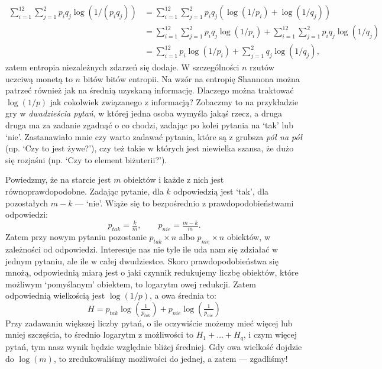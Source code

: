 \documentclass[10pt,a4paper]{article}
\begin{document}
\begin{align}
    \sum_{i=1}^{12} \sum_{j=1}^2 p_i q_j \log(1/(p_i q_j))
    &= \sum_{i=1}^{12} \sum_{j=1}^2 p_i q_j \left( \log(1/p_i) + \log(1/q_j) \right)\\
    &= \sum_{i=1}^{12} \sum_{j=1}^2 p_i q_j \log(1/p_i)
    +\sum_{i=1}^{12} \sum_{j=1}^2 p_i q_j \log(1/q_j)\\
    &= \sum_{i=1}^{12} p_i \log(1/p_i)
    + \sum_{j=1}^2 q_j \log(1/q_j),
\end{align}
%
zatem entropia niezależnych zdarzeń się dodaje.
W szczególności $n$ rzutów uczciwą monetą to $n$ bitów bitów entropii.
%
%
Na wzór na entropię Shannona można patrzeć również jak na średnią uzyskaną informację.
Dlaczego można traktować $\log(1/p)$ jak cokolwiek związanego z informacją?
Zobaczmy to na przykładzie gry w \emph{dwadzieścia pytań}, w której jedna osoba wymyśla jakąś rzecz, a druga druga ma za zadanie zgadnąć o co chodzi, zadając po kolei pytania na `tak' lub `nie'.
Zastanawiało mnie czy warto zadawać pytania, które są z grubsza \emph{pół na pół} (np. `Czy to jest żywe?'), czy też takie w których jest niewielka szansa, że dużo się rozjaśni (np. `Czy to element biżuterii?').

Powiedzmy, że na starcie jest $m$ obiektów i każde z nich jest równoprawdopodobne.
Zadając pytanie, dla $k$ odpowiedzią jest `tak', dla pozostałych $m-k$ --- `nie'.
Wiąże się to bezpośrednio z prawdopodobieństwami odpowiedzi:
%
\begin{equation}
    p_{tak} = \tfrac{k}{m}, \qquad p_{nie} = \tfrac{m-k}{m}.
\end{equation}
%
Zatem przy nowym pytaniu pozostanie $p_{tak} \times n$ albo $p_{nie} \times n$ obiektów, w zależności od odpowiedzi.
Interesuje nas nie tyle ile uda nam się zdziałać w jednym pytaniu, ale ile w całej dwudziestce.
Skoro prawdopodobieństwa się mnożą, odpowiednią miarą jest o jaki czynnik redukujemy liczbę obiektów, które możliwym `pomyślanym' obiektem, to logarytm owej redukcji.
Zatem odpowiednią wielkością jest $\log(1/p)$, a owa średnia to:
%
\begin{equation}
    H = p_{tak} \log \left(\tfrac{1}{p_{tak}} \right) + p_{nie} \log \left(\tfrac{1}{p_{nie}} \right)
\end{equation}
%
Przy zadawaniu większej liczby pytań, o ile oczywiście możemy mieć więcej lub mniej szczęścia, to średnio logarytm z możliwości to $H_1 + \ldots + H_{q}$, i czym więcej pytań, tym nasz wynik będzie względnie bliżej średniej. 
Gdy owa wielkość dojdzie do $\log(m)$, to zredukowaliśmy możliwości do jednej, a zatem --- zgadliśmy!
\end{document}
